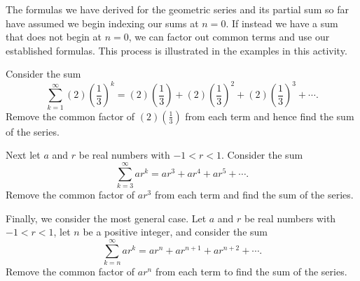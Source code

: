 \begin{activity} \label{8.2.Act3} The formulas we have derived for the geometric series and its partial sum so far have assumed we begin indexing our sums at $n=0$. If instead we have a sum that does not begin at $n=0$, we can factor out common terms and use our established formulas.  This process is illustrated in the examples in this activity.
\ba
\item Consider the sum
\[ \sum_{k=1}^{\infty} (2)\left(\frac{1}{3}\right)^k = (2)\left(\frac{1}{3}\right) + (2)\left(\frac{1}{3}\right)^2 + (2)\left(\frac{1}{3}\right)^3 + \cdots .\]
Remove the common factor of $(2)\left(\frac{1}{3}\right)$ from each term and hence find the sum of the series. 

\item Next let $a$ and $r$ be real numbers with $-1<r<1$. Consider the sum  
\[\sum_{k=3}^{\infty} ar^k = ar^3+ar^4+ar^5 + \cdots.\]
Remove the common factor of $ar^3$ from each term and find the sum of the series. 

\item Finally, we consider the most general case. Let $a$ and $r$ be real numbers with $-1<r<1$, let $n$ be a positive integer, and consider the sum
\[ \sum_{k=n}^{\infty} ar^k = ar^n+ar^{n+1}+ar^{n+2} + \cdots .\]
Remove the common factor of $ar^n$ from each term to find the sum of the series. 

\ea
\end{activity}

